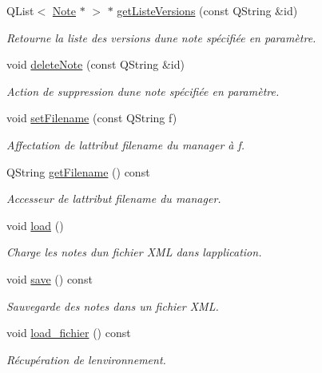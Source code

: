 \begin{DoxyCompactItemize}
Q\+List$<$ \hyperlink{class_note}{Note} $\ast$ $>$ $\ast$ \hyperlink{class_notes_manager_ae3af78108c46b9816207e66fcde64c5b}{get\+Liste\+Versions} (const Q\+String \&id)
\begin{DoxyCompactList}\small\item\em Retourne la liste des versions d\textquotesingle{}une note spécifiée en paramètre. \end{DoxyCompactList}\item 
void \hyperlink{class_notes_manager_a989429244c36c35ef68204f6ae2a0a5f}{delete\+Note} (const Q\+String \&id)
\begin{DoxyCompactList}\small\item\em Action de suppression d\textquotesingle{}une note spécifiée en paramètre. \end{DoxyCompactList}\item 
void \hyperlink{class_notes_manager_a797d858176de3f5e64aa8194797909fb}{set\+Filename} (const Q\+String f)
\begin{DoxyCompactList}\small\item\em Affectation de l\textquotesingle{}attribut filename du manager à f. \end{DoxyCompactList}\item 
Q\+String \hyperlink{class_notes_manager_a566cbb0dd7b606ec34629a2aa8010b73}{get\+Filename} () const
\begin{DoxyCompactList}\small\item\em Accesseur de l\textquotesingle{}attribut filename du manager. \end{DoxyCompactList}\item 
void \hyperlink{class_notes_manager_ad4fb2de50633dd25b71024343341cd64}{load} ()
\begin{DoxyCompactList}\small\item\em Charge les notes d\textquotesingle{}un fichier X\+ML dans l\textquotesingle{}application. \end{DoxyCompactList}\item 
void \hyperlink{class_notes_manager_ad271bd7f8079b01b04a32b886b498bac}{save} () const
\begin{DoxyCompactList}\small\item\em Sauvegarde des notes dans un fichier X\+ML. \end{DoxyCompactList}\item 
void \hyperlink{class_notes_manager_a716744a0992b0ce74d43d80c7d987531}{load\+\_\+fichier} () const
\begin{DoxyCompactList}\small\item\em Récupération de l\textquotesingle{}environnement. \end{DoxyCompactList}\item 

\end{DoxyCompactItemize}
